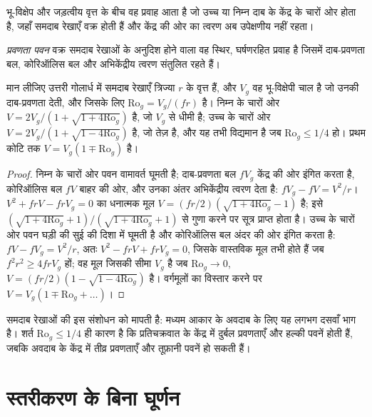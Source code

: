 भू-विक्षेप और जड़त्वीय वृत्त के बीच वह प्रवाह आता है जो उच्च या निम्न दाब के केंद्र के चारों ओर होता है,
जहाँ समदाब रेखाएँ वक्र होती हैं और केंद्र की ओर का त्वरण
अब उपेक्षणीय नहीं रहता।

\begin{definition}\label{def:b3:gfd-foundations:gradient}
\emph{प्रवणता पवन} वक्र समदाब रेखाओं के अनुदिश होने वाला वह स्थिर,
घर्षणरहित प्रवाह है जिसमें दाब-प्रवणता बल, कोरिऑलिस बल और
अभिकेंद्रीय त्वरण संतुलित रहते हैं।
\end{definition}

\begin{proposition}[वक्रता संशोधन]\label{prop:b3:gfd-foundations:gradient}
मान लीजिए उत्तरी गोलार्ध में समदाब रेखाएँ त्रिज्या $r$ के वृत्त हैं, और
$V_g$ वह भू-विक्षेपी चाल है जो उनकी दाब-प्रवणता देती, और जिसके लिए
$\mathrm{Ro}_g = V_g/(fr)$ है। निम्न के चारों ओर 
$V = 2V_g/(1 + \sqrt{1 + 4\mathrm{Ro}_g})$ है, जो $V_g$ से धीमी है; उच्च के चारों ओर
$V = 2V_g/(1 + \sqrt{1 - 4\mathrm{Ro}_g})$ है, जो तेज़ है, और यह तभी विद्यमान है
जब $\mathrm{Ro}_g \le 1/4$ हो। प्रथम कोटि तक $V = V_g(1 \mp \mathrm{Ro}_g)$ है।
\end{proposition}

\begin{proof}
निम्न के चारों ओर पवन वामावर्त घूमती है; दाब-प्रवणता बल
$fV_g$ केंद्र की ओर इंगित करता है, कोरिऑलिस बल $fV$ बाहर की ओर, और उनका
अंतर अभिकेंद्रीय त्वरण देता है: $fV_g - fV = V^2/r$। $V^2 + frV - frV_g = 0$ का
धनात्मक मूल $V = (fr/2)(\sqrt{1 +
4\mathrm{Ro}_g} - 1)$ है; इसे $(\sqrt{1 + 4\mathrm{Ro}_g} +
1)/(\sqrt{1 + 4\mathrm{Ro}_g} + 1)$ से गुणा करने पर सूत्र प्राप्त होता है। उच्च के चारों ओर
पवन घड़ी की सुई की दिशा में घूमती है और कोरिऑलिस बल अंदर की ओर इंगित करता है: $fV - fV_g =
V^2/r$, अतः $V^2 - frV + frV_g = 0$, जिसके वास्तविक मूल तभी होते हैं जब $f^2r^2
\ge 4frV_g$ हों; वह मूल जिसकी सीमा $V_g$ है जब $\mathrm{Ro}_g \to 0$,
$V = (fr/2)(1 - \sqrt{1 - 4\mathrm{Ro}_g})$ है। वर्गमूलों का विस्तार करने पर
$V = V_g(1 \mp \mathrm{Ro}_g + \dots)$।
\end{proof}

समदाब रेखाओं की  इस संशोधन को मापती है: मध्यम आकार के
अवदाब के लिए यह लगभग दसवाँ भाग है। शर्त $\mathrm{Ro}_g \le 1/4$ ही कारण है कि
प्रतिचक्रवात के केंद्र में दुर्बल प्रवणताएँ और हल्की पवनें होती हैं, जबकि
अवदाब के केंद्र में तीव्र प्रवणताएँ और तूफ़ानी पवनें हो सकती हैं।

\section{स्तरीकरण के बिना घूर्णन}\label{sec:b3:gfd-foundations:taylor}

